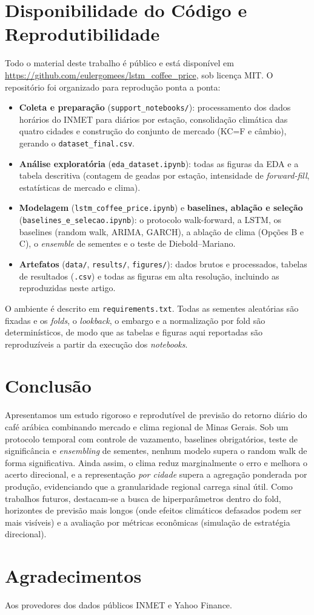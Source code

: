 \documentclass[12pt]{article}
\begin{document}
\section{Disponibilidade do Código e Reprodutibilidade}

Todo o material deste trabalho é público e está disponível em
\url{https://github.com/eulergomees/lstm_coffee_price}, sob licença MIT. O repositório
foi organizado para reprodução ponta a ponta:

\begin{itemize}
  \item \textbf{Coleta e preparação} (\texttt{support\_notebooks/}): processamento dos
  dados horários do INMET para diários por estação, consolidação climática das quatro
  cidades e construção do conjunto de mercado (KC=F e câmbio), gerando o
  \texttt{dataset\_final.csv}.
  \item \textbf{Análise exploratória} (\texttt{eda\_dataset.ipynb}): todas as figuras da
  EDA e a tabela descritiva (contagem de geadas por estação, intensidade de
  \emph{forward-fill}, estatísticas de mercado e clima).
  \item \textbf{Modelagem} (\texttt{lstm\_coffee\_price.ipynb}) e \textbf{baselines,
  ablação e seleção} (\texttt{baselines\_e\_selecao.ipynb}): o protocolo walk-forward, a
  LSTM, os baselines (random walk, ARIMA, GARCH), a ablação de clima (Opções B e C), o
  \emph{ensemble} de sementes e o teste de Diebold--Mariano.
  \item \textbf{Artefatos} (\texttt{data/}, \texttt{results/}, \texttt{figures/}): dados
  brutos e processados, tabelas de resultados (\texttt{.csv}) e todas as figuras em alta
  resolução, incluindo as reproduzidas neste artigo.
\end{itemize}

O ambiente é descrito em \texttt{requirements.txt}. Todas as sementes aleatórias são
fixadas e os \emph{folds}, o \emph{lookback}, o embargo e a normalização por fold são
determinísticos, de modo que as tabelas e figuras aqui reportadas são reproduzíveis a
partir da execução dos \emph{notebooks}.

\section{Conclusão}

Apresentamos um estudo rigoroso e reprodutível de previsão do retorno diário do café
arábica combinando mercado e clima regional de Minas Gerais. Sob um protocolo temporal
com controle de vazamento, baselines obrigatórios, teste de significância e
\emph{ensembling} de sementes, nenhum modelo supera o random walk de forma
significativa. Ainda assim, o clima reduz marginalmente o erro e melhora o acerto
direcional, e a representação \emph{por cidade} supera a agregação ponderada por
produção, evidenciando que a granularidade regional carrega sinal útil. Como trabalhos
futuros, destacam-se a busca de hiperparâmetros dentro do fold, horizontes de previsão
mais longos (onde efeitos climáticos defasados podem ser mais visíveis) e a avaliação por
métricas econômicas (simulação de estratégia direcional).

\section*{Agradecimentos}
Aos provedores dos dados públicos INMET e Yahoo Finance.



\end{document}
